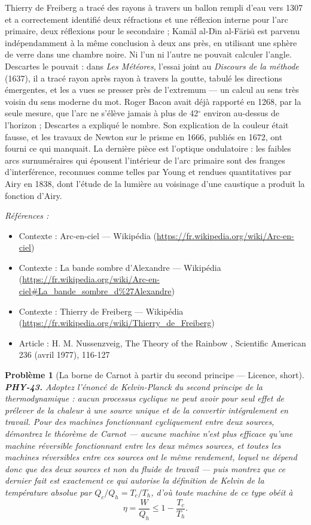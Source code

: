 \documentclass[11pt]{article}
\newtheorem{problem}{Problème}
\newenvironment{refs}{\par\small\noindent\emph{Références :}\begin{itemize}\setlength\itemsep{0pt}}{\end{itemize}\normalsize}
\begin{document}
\noindent Thierry de Freiberg a tracé des rayons à travers un ballon rempli d'eau vers
1307 et a correctement identifié deux réfractions et une réflexion interne pour l'arc primaire,
deux réflexions pour le secondaire ; Kam\=al al-D\={\i}n al-F\=aris\={\i} est parvenu indépendamment à la même
conclusion à deux ans près, en utilisant une sphère de verre dans une chambre noire. Ni l'un ni
l'autre ne pouvait calculer l'angle. Descartes le pouvait : dans \textit{Les Météores}, l'essai
joint au \textit{Discours de la méthode} (1637), il a tracé rayon après rayon à travers la goutte,
tabulé les directions émergentes, et les a vues se presser près de l'extremum --- un calcul au sens
très voisin du sens moderne du mot. Roger Bacon avait déjà rapporté en 1268, par la seule mesure,
que l'arc ne s'élève jamais à plus de 42$^\circ$ environ au-dessus de l'horizon ; Descartes a expliqué le
nombre. Son explication de la couleur était fausse, et les travaux de Newton sur le prisme en
1666, publiés en 1672, ont fourni ce qui manquait. La dernière pièce est l'optique ondulatoire :
les faibles arcs surnuméraires qui épousent l'intérieur de l'arc primaire sont des franges
d'interférence, reconnues comme telles par Young et rendues quantitatives par Airy en 1838, dont
l'étude de la lumière au voisinage d'une caustique a produit la fonction d'Airy.

\begin{refs}
\item Contexte : Arc-en-ciel --- Wikipédia (\url{https://fr.wikipedia.org/wiki/Arc-en-ciel})
\item Contexte : La bande sombre d'Alexandre --- Wikipédia (\url{https://fr.wikipedia.org/wiki/Arc-en-ciel#La_bande_sombre_d%27Alexandre})
\item Contexte : Thierry de Freiberg --- Wikipédia (\url{https://fr.wikipedia.org/wiki/Thierry_de_Freiberg})
\item Article : H. M. Nussenzveig, \og{} The Theory of the Rainbow \fg{}, Scientific American 236 (avril 1977), 116-127
\end{refs}

\bigskip

\begin{problem}[{La borne de Carnot à partir du second principe --- Licence, short}]
\textbf{PHY-43.} Adoptez l'énoncé de Kelvin-Planck du second principe de la
thermodynamique : aucun processus cyclique ne peut avoir pour seul effet de prélever de la chaleur
à une source unique et de la convertir intégralement en travail. Pour des machines fonctionnant
cycliquement entre deux sources, démontrez le théorème de Carnot --- aucune machine n'est plus
efficace qu'une machine réversible fonctionnant entre les deux mêmes sources, et toutes les
machines réversibles entre ces sources ont le même rendement, lequel ne dépend donc que des deux
sources et non du fluide de travail --- puis montrez que ce dernier fait est exactement ce qui
autorise la définition de Kelvin de la température absolue par
$ Q_{c}/Q_{h} = T_{c}/T_{h} $, d'où toute machine de ce type obéit à
\[ \eta = \frac{W}{Q_{h}} \le 1 - \frac{T_{c}}{T_{h}}. \]
\end{problem}
\end{document}
